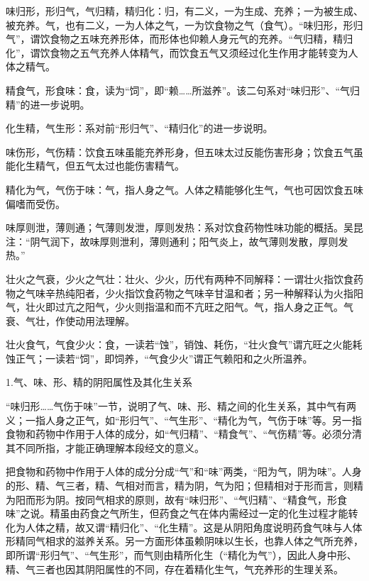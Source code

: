 \documentclass[12pt]{ctexbook}
\begin{document}
\begin{jiaozhu}
  \item 味归形，形归气，气归精，精归化：归，有二义，一为生成、充养；一为被生成、被充养。气，也有二义，一为人体之气，一为饮食物之气（食气）。“味归形，形归气”，谓饮食物之五味充养形体，而形体也仰赖人身元气的充养。“气归精，精归化”，谓饮食物之五气充养人体精气，而饮食五气又须经过化生作用才能转变为人体之精气。
  \item 精食气，形食味：食，读为“饲”，即“赖……所滋养”。该二句系对“味归形”、“气归精”的进一步说明。
  \item 化生精，气生形：系对前“形归气”、“精归化”的进一步说明。
  \item 味伤形，气伤精：饮食五味虽能充养形身，但五味太过反能伤害形身；饮食五气虽能化生精气，但五气太过也能伤害精气。
  \item 精化为气，气伤于味：气，指人身之气。人体之精能够化生气，气也可因饮食五味偏嗜而受伤。
  \item 味厚则泄，薄则通；气薄则发泄，厚则发热：系对饮食药物性味功能的概括。吴昆注：“阴气润下，故味厚则泄利，薄则通利；阳气炎上，故气薄则发散，厚则发热。”
  \item 壮火之气衰，少火之气壮：壮火、少火，历代有两种不同解释：一谓壮火指饮食药物之气味辛热纯阳者，少火指饮食药物之气味辛甘温和者；另一种解释认为火指阳气，壮火即过亢之阳气，少火则指温和而不亢旺之阳气。气，指人身之正气。气衰、气壮，作使动用法理解。
  \item 壮火食气，气食少火：食，一读若“蚀”，销蚀、耗伤，“壮火食气”谓亢旺之火能耗蚀正气；一读若“饲”，即饲养，“气食少火”谓正气赖阳和之火所温养。
\end{jiaozhu}



1.气、味、形、精的阴阳属性及其化生关系

“味归形……气伤于味”一节，说明了气、味、形、精之间的化生关系，其中气有两义；一指人身之正气，如“形归气”、“气生形”、“精化为气，气伤于味”等。另一指食物和药物中作用于人体的成分，如“气归精”、“精食气”、“气伤精”等。必须分清其不同所指，才能正确理解本段经文的意义。

把食物和药物中作用于人体的成分分成“气”和“味”两类，“阳为气，阴为味”。人身的形、精、气三者，精、气相对而言，精为阴，气为阳；但精相对于形而言，则精为阳而形为阴。按同气相求的原则，故有“味归形”、“气归精”、“精食气，形食味”之说。精虽由药食之气所生，但药食之气在体内需经过一定的化生过程才能转化为人体之精，故又谓“精归化”、“化生精”。这是从阴阳角度说明药食气味与人体形精同气相求的滋养关系。另一方面形体虽赖阴味以生长，也靠人体之气所充养，即所谓“形归气”、“气生形”，而气则由精所化生（“精化为气”），因此人身中形、精、气三者也因其阴阳属性的不同，存在着精化生气，气充养形的生理关系。
\end{document}
